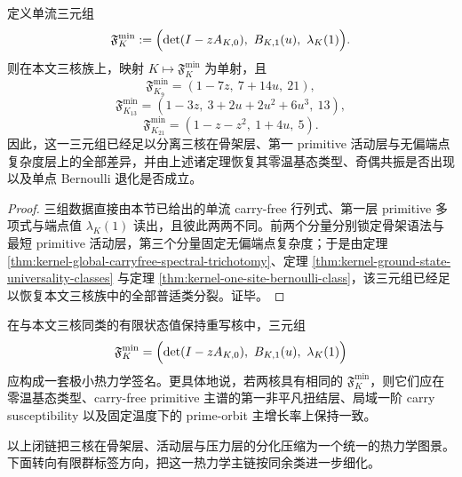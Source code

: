 \begin{corollary}[三核的最小热力学签名]\label{cor:kernel-minimal-thermo-signature-three}
定义单流三元组
\[
\mathfrak F_K^{\min}
:=
\Bigl(
\det(I-zA_{K,0}),
\ B_{K,1}(u),
\ \lambda_K(1)
\Bigr).
\]
则在本文三核族上，映射 \(K\mapsto\mathfrak F_K^{\min}\) 为单射，且
\[
\mathfrak F_{K_9}^{\min}=(1-7z,\ 7+14u,\ 21),
\]
\[
\mathfrak F_{K_{13}}^{\min}=(1-3z,\ 3+2u+2u^2+6u^3,\ 13),
\]
\[
\mathfrak F_{K_{21}}^{\min}=(1-z-z^2,\ 1+4u,\ 5).
\]
因此，这一三元组已经足以分离三核在骨架层、第一 primitive 活动层与无偏端点复杂度层上的全部差异，并由上述诸定理恢复其零温基态类型、奇偶共振是否出现以及单点 Bernoulli 退化是否成立。
\end{corollary}
\begin{proof}
三组数据直接由本节已给出的单流 carry-free 行列式、第一层 primitive 多项式与端点值 \(\lambda_K(1)\) 读出，且彼此两两不同。前两个分量分别锁定骨架语法与最短 primitive 活动层，第三个分量固定无偏端点复杂度；于是由定理 \ref{thm:kernel-global-carryfree-spectral-trichotomy}、定理 \ref{thm:kernel-ground-state-universality-classes} 与定理 \ref{thm:kernel-one-site-bernoulli-class}，该三元组已经足以恢复本文三核族中的全部普适类分裂。证毕。
\end{proof}

\begin{conjecture}[有限状态值保持重写核的最小热力学签名]\label{conj:kernel-minimal-thermo-signature}
在与本文三核同类的有限状态值保持重写核中，三元组
\[
\mathfrak F_K^{\min}
=
\Bigl(
\det(I-zA_{K,0}),
\ B_{K,1}(u),
\ \lambda_K(1)
\Bigr)
\]
应构成一套极小热力学签名。更具体地说，若两核具有相同的 \(\mathfrak F_K^{\min}\)，则它们应在零温基态类型、carry-free primitive 主谱的第一非平凡扭结层、局域一阶 carry susceptibility 以及固定温度下的 prime-orbit 主增长率上保持一致。
\end{conjecture}

以上闭链把三核在骨架层、活动层与压力层的分化压缩为一个统一的热力学图景。下面转向有限群标签方向，把这一热力学主链按同余类进一步细化。
